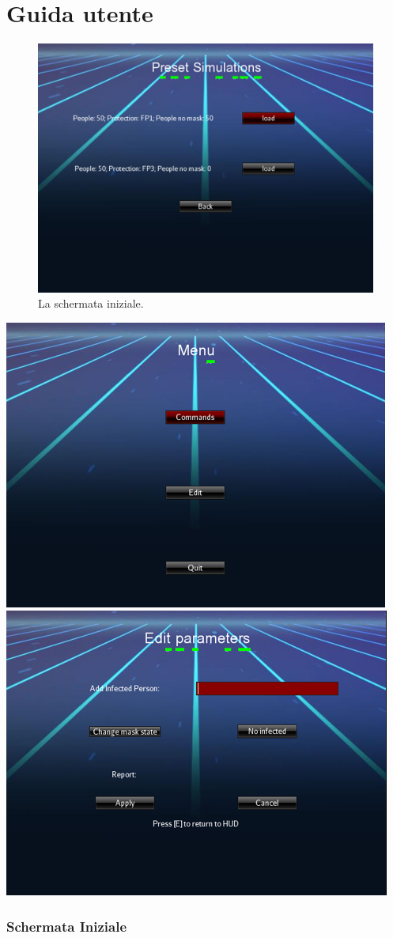 \appendix

\chapter{Guida utente}

\begin{figure}[h]
\centering{}
\includegraphics{2.png} 
\caption{La schermata iniziale.}
\label{img:startscreen}
\end{figure}

\includegraphics[scale=1]{4.png}
\includegraphics[scale=1]{5.png}

\subsection{Schermata Iniziale}





